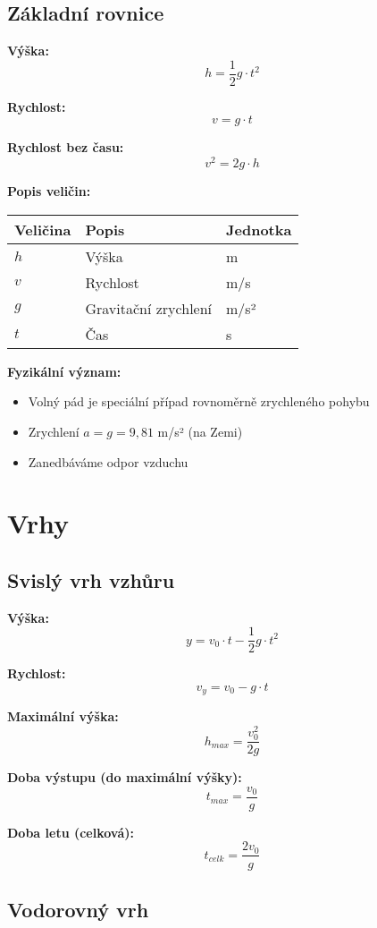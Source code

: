 \documentclass[11pt,a4paper]{article}
\begin{document}
\subsection{Základní rovnice}

\textbf{Výška:}
\[h = \frac{1}{2} g \cdot t^2\]

\textbf{Rychlost:}
\[v = g \cdot t\]

\textbf{Rychlost bez času:}
\[v^2 = 2 g \cdot h\]

\textbf{Popis veličin:}

\begin{longtable}{lll}
\toprule
Veličina & Popis & Jednotka \\
\midrule
$h$ & Výška & m \\
$v$ & Rychlost & m/s \\
$g$ & Gravitační zrychlení & m/s² \\
$t$ & Čas & s \\
\bottomrule
\end{longtable}

\textbf{Fyzikální význam:}
\begin{itemize}
\item Volný pád je speciální případ rovnoměrně zrychleného pohybu
\item Zrychlení $a = g = 9{,}81$ m/s² (na Zemi)
\item Zanedbáváme odpor vzduchu
\end{itemize}

\clearpage

\section{Vrhy}

\subsection{Svislý vrh vzhůru}

\textbf{Výška:}
\[y = v_0 \cdot t - \frac{1}{2} g \cdot t^2\]

\textbf{Rychlost:}
\[v_y = v_0 - g \cdot t\]

\textbf{Maximální výška:}
\[h_{max} = \frac{v_0^2}{2g}\]

\textbf{Doba výstupu (do maximální výšky):}
\[t_{max} = \frac{v_0}{g}\]

\textbf{Doba letu (celková):}
\[t_{celk} = \frac{2v_0}{g}\]

\subsection{Vodorovný vrh}
\end{document}
